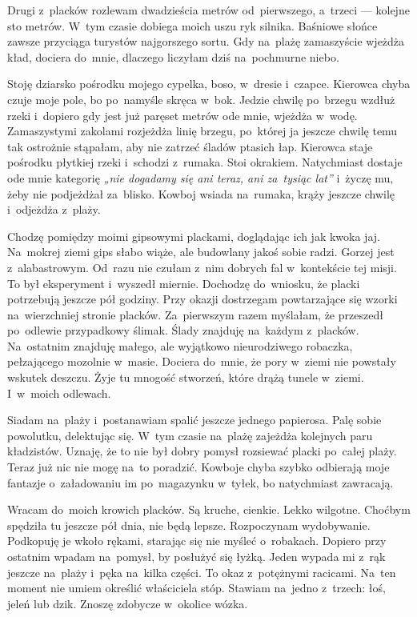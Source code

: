 \documentclass[9pt, a5paper]{memoir}
\begin{document}
Drugi z~placków rozlewam dwadzieścia metrów od~pierwszego, a~trzeci --- kolejne sto metrów. W~tym czasie dobiega moich uszu ryk silnika. Baśniowe słońce zawsze przyciąga turystów najgorszego sortu. Gdy na~plażę zamaszyście wjeżdża kład, dociera do~mnie, dlaczego liczyłam dziś na~pochmurne niebo.

Stoję dziarsko pośrodku mojego cypelka, boso, w~dresie i~czapce. Kierowca chyba czuje moje pole, bo po~namyśle skręca w~bok. Jedzie chwilę po~brzegu wzdłuż rzeki i~dopiero gdy jest już paręset metrów ode mnie, wjeżdża w~wodę. Zamaszystymi zakolami rozjeżdża linię brzegu, po~której ja jeszcze chwilę temu tak ostrożnie stąpałam, aby nie zatrzeć śladów ptasich łap. Kierowca staje pośrodku płytkiej rzeki i~schodzi z~rumaka. Stoi okrakiem. Natychmiast dostaje ode mnie kategorię \textit{„nie dogadamy się ani teraz, ani za~tysiąc lat”} i~życzę mu, żeby nie podjeżdżał za~blisko. Kowboj wsiada na~rumaka, krąży jeszcze chwilę i~odjeżdża z~plaży.

Chodzę pomiędzy moimi gipsowymi plackami, doglądając ich jak kwoka jaj. Na~mokrej ziemi gips słabo wiąże, ale budowlany jakoś sobie radzi. Gorzej jest z~alabastrowym. Od~razu nie czułam z~nim dobrych fal w~kontekście tej misji. To był eksperyment i~wyszedł miernie. Dochodzę do~wniosku, że placki potrzebują jeszcze pół godziny. Przy okazji dostrzegam powtarzające się wzorki na~wierzchniej stronie placków. Za~pierwszym razem myślałam, że przeszedł po~odlewie przypadkowy ślimak. Ślady znajduję na~każdym z~placków. Na~ostatnim znajduję małego, ale wyjątkowo nieurodziwego robaczka, pełzającego mozolnie w~masie. Dociera do~mnie, że pory w~ziemi nie powstały wskutek deszczu. Żyje tu mnogość stworzeń, które drążą tunele w~ziemi. I~w~moich odlewach.

Siadam na~plaży i~postanawiam spalić jeszcze jednego papierosa. Palę sobie powolutku, delektując się. W~tym czasie na~plażę zajeżdża kolejnych paru kładzistów. Uznaję, że to nie był dobry pomysł rozsiewać placki po~całej plaży. Teraz już nic nie mogę na~to poradzić. Kowboje chyba szybko odbierają moje fantazje o~załadowaniu im po~magazynku w~tyłek, bo natychmiast zawracają.

Wracam do~moich krowich placków. Są kruche, cienkie. Lekko wilgotne. Choćbym spędziła tu jeszcze pół dnia, nie będą lepsze. Rozpoczynam wydobywanie. Podkopuję je wkoło rękami, starając się nie myśleć o~robakach. Dopiero przy ostatnim wpadam na~pomysł, by posłużyć się łyżką. Jeden wypada mi z~rąk jeszcze na~plaży i~pęka na~kilka części. To okaz z~potężnymi racicami. Na~ten moment nie umiem określić właściciela stóp. Stawiam na~jedno z~trzech: łoś, jeleń lub dzik. Znoszę zdobycze w~okolice wózka.
\end{document}

